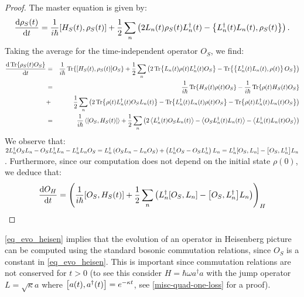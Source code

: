 \begin{proof}
    The master equation is given by:
    \begin{equation}
        \timeDeriv{\rho_S(t)} = \ihbar \commutator{H_S(t)}{\rho_S(t)} + \frac{1}{2} \sum_{n} \left(2 L_n(t) \rho_S(t) L_n^\dagger(t) - \anticomm{L_n^\dagger(t) L_n(t)}{\rho_S(t)}\right).
    \end{equation}
    Taking the average for the time-independent operator $O_S$, we find:
    \begin{eqnarray}
        \timeDeriv{\Tr{\rho_S(t) O_S}} &=& \ihbar \Tr{\commutator{H_S(t)}{\rho_S(t)}  O_S} + \frac{1}{2} \sum_{n} \left(2 \Tr{L_n(t) \rho(t) L_n^\dagger(t) O_S} - \Tr{\anticomm{L_n^\dagger(t) L_n(t)}{\rho(t)} O_S }\right) \nonumber\\
        &=& \ihbar \Tr{H_S(t) \rho(t) O_S} - \ihbar \Tr{\rho(t) H_S(t)  O_S}\nonumber\\
        &+& \frac{1}{2} \sum_{n} \left(2 \Tr{\rho(t) L_n^\dagger(t) O_S L_n(t)} - \Tr{L_n^\dagger(t) L_n(t) \rho(t) O_S} - \Tr{\rho(t) L_n^\dagger(t) L_n(t) O_S}\right)\nonumber\\
        &=& \ihbar \average{\commutator{O_S}{H_S(t)}} + \frac{1}{2} \sum_{n} \left(2 \average{L_n^\dagger(t) O_S L_n(t)} - \average{O_S L_n^\dagger(t) L_n(t)} - \average{L_n^\dagger(t) L_n(t) O_S}\right)\nonumber
    \end{eqnarray}
    We observe that: $2 L_n^\dagger O_S L_n - O_S L_n^\dagger L_n - L_n^\dagger L_n O_S = L_n^\dagger \left(O_S L_n - L_n O_S\right) + \left(L_n^\dagger O_S - O_S L_n^\dagger\right) L_n = L_n^\dagger \commutator{O_S}{L_n} - \commutator{O_S}{L_n^\dagger} L_n$. Furthermore, since our computation does not depend on the initial state $\rho(0)$, we deduce that:
    \begin{equation}
        \timeDeriv{O_H} = \left(\ihbar \commutator{O_S}{H_S(t)} + \frac{1}{2} \sum_n \left( L^\dagger_n \commutator{O_S}{L_n}  - \commutator{O_S}{L^\dagger_n} L_n \right)\right)_H
    \end{equation}
\end{proof}

\begin{remark}
    \autoref{eq_evo_heisen} implies that the evolution of an operator in Heisenberg picture can be computed using the standard bosonic commutation relations, since $O_S$ is a constant in \autoref{eq_evo_heisen}. This is important since commutation relations are not conserved for $t > 0$ (to see this consider $H = \hbar \omega a^\dagger a$ with the jump operator $L = \sqrt{\kappa} a$ where $\commutator{a(t)}{a^\dagger(t)} = e^{-\kappa t}$, see \autoref{misc-quad-one-loss} for a proof).
\end{remark}

